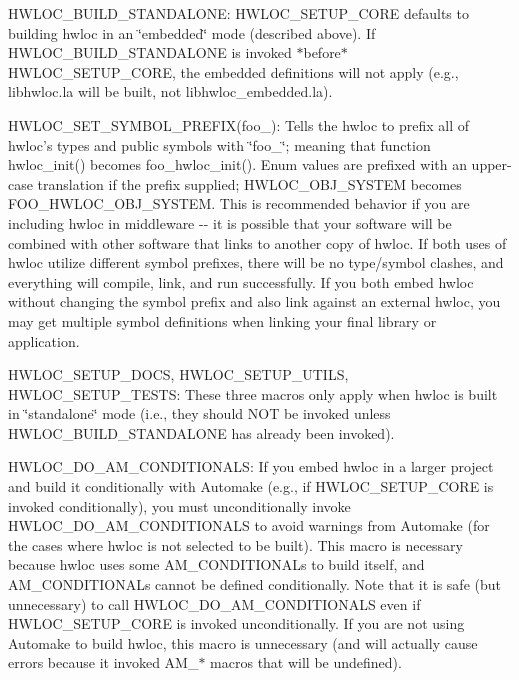 \begin{DoxyItemize}
\item HWLOC\_\-BUILD\_\-STANDALONE: HWLOC\_\-SETUP\_\-CORE defaults to building hwloc in an \char`\"{}embedded\char`\"{} mode (described above). If HWLOC\_\-BUILD\_\-STANDALONE is invoked $\ast$before$\ast$ HWLOC\_\-SETUP\_\-CORE, the embedded definitions will not apply (e.g., libhwloc.la will be built, not libhwloc\_\-embedded.la).
\end{DoxyItemize}


\begin{DoxyItemize}
\item HWLOC\_\-SET\_\-SYMBOL\_\-PREFIX(foo\_\-): Tells the hwloc to prefix all of hwloc's types and public symbols with \char`\"{}foo\_\-\char`\"{}; meaning that function hwloc\_\-init() becomes foo\_\-hwloc\_\-init(). Enum values are prefixed with an upper-\/case translation if the prefix supplied; HWLOC\_\-OBJ\_\-SYSTEM becomes FOO\_\-HWLOC\_\-OBJ\_\-SYSTEM. This is recommended behavior if you are including hwloc in middleware -\/-\/ it is possible that your software will be combined with other software that links to another copy of hwloc. If both uses of hwloc utilize different symbol prefixes, there will be no type/symbol clashes, and everything will compile, link, and run successfully. If you both embed hwloc without changing the symbol prefix and also link against an external hwloc, you may get multiple symbol definitions when linking your final library or application.
\end{DoxyItemize}


\begin{DoxyItemize}
\item HWLOC\_\-SETUP\_\-DOCS, HWLOC\_\-SETUP\_\-UTILS, HWLOC\_\-SETUP\_\-TESTS: These three macros only apply when hwloc is built in \char`\"{}standalone\char`\"{} mode (i.e., they should NOT be invoked unless HWLOC\_\-BUILD\_\-STANDALONE has already been invoked).
\end{DoxyItemize}


\begin{DoxyItemize}
\item HWLOC\_\-DO\_\-AM\_\-CONDITIONALS: If you embed hwloc in a larger project and build it conditionally with Automake (e.g., if HWLOC\_\-SETUP\_\-CORE is invoked conditionally), you must unconditionally invoke HWLOC\_\-DO\_\-AM\_\-CONDITIONALS to avoid warnings from Automake (for the cases where hwloc is not selected to be built). This macro is necessary because hwloc uses some AM\_\-CONDITIONALs to build itself, and AM\_\-CONDITIONALs cannot be defined conditionally. Note that it is safe (but unnecessary) to call HWLOC\_\-DO\_\-AM\_\-CONDITIONALS even if HWLOC\_\-SETUP\_\-CORE is invoked unconditionally. If you are not using Automake to build hwloc, this macro is unnecessary (and will actually cause errors because it invoked AM\_\-$\ast$ macros that will be undefined).
\end{DoxyItemize}

